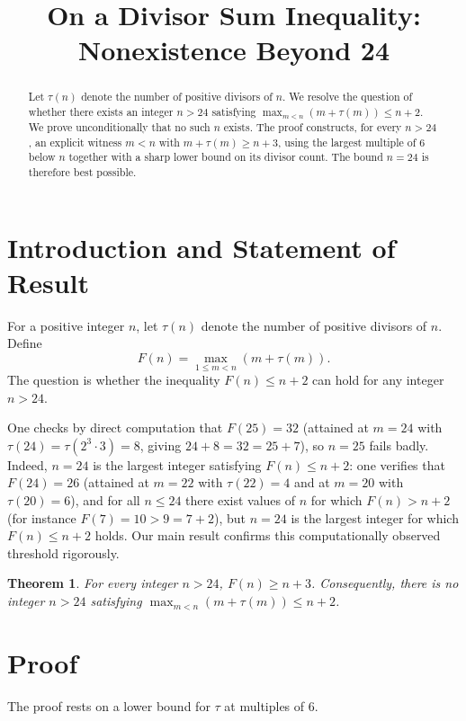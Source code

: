 \documentclass[a4paper]{amsart}
\title{On a Divisor Sum Inequality: Nonexistence Beyond 24}
\newtheorem{theorem}{Theorem}
\theoremstyle{definition}
\begin{document}
\maketitle

\begin{abstract}
Let $\tau(n)$ denote the number of positive divisors of $n$.
We resolve the question of whether there exists an integer $n > 24$ satisfying
$\max_{m < n}(m + \tau(m)) \leq n + 2$.
We prove unconditionally that no such $n$ exists.
The proof constructs, for every $n > 24$, an explicit witness $m < n$ with $m + \tau(m) \geq n + 3$,
using the largest multiple of $6$ below $n$ together with a sharp lower bound on its divisor count.
The bound $n = 24$ is therefore best possible.
\end{abstract}

\section{Introduction and Statement of Result}

For a positive integer $n$, let $\tau(n)$ denote the number of positive divisors of $n$.
Define
\[
F(n) = \max_{1 \leq m < n}(m + \tau(m)).
\]
The question is whether the inequality $F(n) \leq n + 2$ can hold for any integer $n > 24$.

One checks by direct computation that
$F(25) = 32$ (attained at $m = 24$ with $\tau(24) = \tau(2^3\cdot 3) = 8$,
giving $24 + 8 = 32 = 25 + 7$), so $n = 25$ fails badly.
Indeed, $n = 24$ is the largest integer satisfying $F(n) \leq n + 2$: one verifies that
$F(24) = 26$ (attained at $m = 22$ with $\tau(22) = 4$ and at $m = 20$ with $\tau(20) = 6$),
and for all $n \leq 24$ there exist values of $n$ for which $F(n) > n + 2$
(for instance $F(7) = 10 > 9 = 7 + 2$), but $n = 24$ is the largest integer
for which $F(n) \leq n + 2$ holds.
Our main result confirms this computationally observed threshold rigorously.

\begin{theorem}
\label{thm:main}
For every integer $n > 24$, $F(n) \geq n + 3$. Consequently, there is no integer $n > 24$
satisfying $\max_{m < n}(m + \tau(m)) \leq n + 2$.
\end{theorem}

\section{Proof}

The proof rests on a lower bound for $\tau$ at multiples of $6$.
\end{document}
